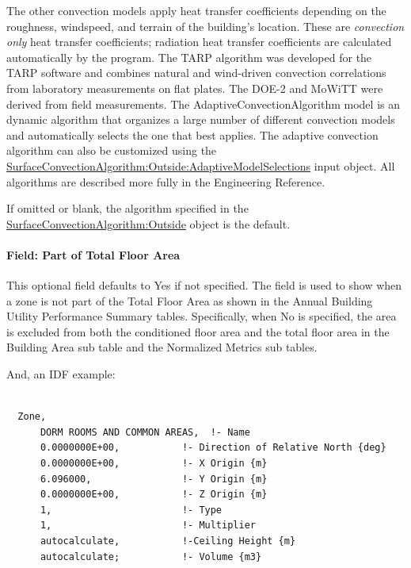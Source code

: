 The other convection models apply heat transfer coefficients depending on the roughness, windspeed, and terrain of the building's location. These are \emph{convection only} heat transfer coefficients; radiation heat transfer coefficients are calculated automatically by the program. The TARP algorithm was developed for the TARP software and combines natural and wind-driven convection correlations from laboratory measurements on flat plates. The DOE-2 and MoWiTT were derived from field measurements. The AdaptiveConvectionAlgorithm model is an dynamic algorithm that organizes a large number of different convection models and automatically selects the one that best applies. The adaptive convection algorithm can also be customized using the \hyperref[surfaceconvectionalgorithmoutsideadaptivemodelselections]{SurfaceConvectionAlgorithm:Outside:AdaptiveModelSelections} input object. All algorithms are described more fully in the Engineering Reference.

If omitted or blank, the algorithm specified in the \hyperref[surfaceconvectionalgorithmoutside]{SurfaceConvectionAlgorithm:Outside} object is the default.

\paragraph{Field: Part of Total Floor Area}\label{field-part-of-total-floor-area}

This optional field defaults to Yes if not specified. The field is used to show when a zone is not part of the Total Floor Area as shown in the Annual Building Utility Performance Summary tables. Specifically, when No is specified, the area is excluded from both the conditioned floor area and the total floor area in the Building Area sub table and the Normalized Metrics sub tables.

And, an IDF example:

\begin{lstlisting}

  Zone,
      DORM ROOMS AND COMMON AREAS,  !- Name
      0.0000000E+00,           !- Direction of Relative North {deg}
      0.0000000E+00,           !- X Origin {m}
      6.096000,                !- Y Origin {m}
      0.0000000E+00,           !- Z Origin {m}
      1,                       !- Type
      1,                       !- Multiplier
      autocalculate,           !-Ceiling Height {m}
      autocalculate;           !- Volume {m3}
\end{lstlisting}


